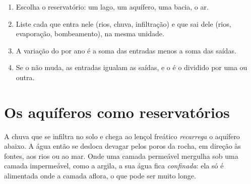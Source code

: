 \begin{method}\label{met:g10:freshwater-resources:budget}
\begin{enumerate}
  \item Escolha o reservatório: um lago, um aquífero, uma bacia, o ar.
  \item Liste cada  que entra nele (rios, chuva, infiltração) e que sai
        dele (rios, evaporação, bombeamento), na mesma unidade.
  \item A variação do  por ano é a soma das entradas menos a soma das
        saídas.
  \item Se o  não muda, as entradas igualam as saídas, e o  é o  dividido por uma ou outra.
\end{enumerate}
\end{method}

\section{Os aquíferos como reservatórios}

A chuva que se infiltra no solo e chega ao lençol freático \emph{recarrega}
o aquífero abaixo. A água então se desloca devagar pelos poros da rocha, em
direção às fontes, aos rios ou ao mar. Onde uma camada permeável mergulha
sob uma camada impermeável, como a argila, a sua água fica
\emph{confinada}: ela só é alimentada onde a camada aflora, o que pode ser
muito longe.


